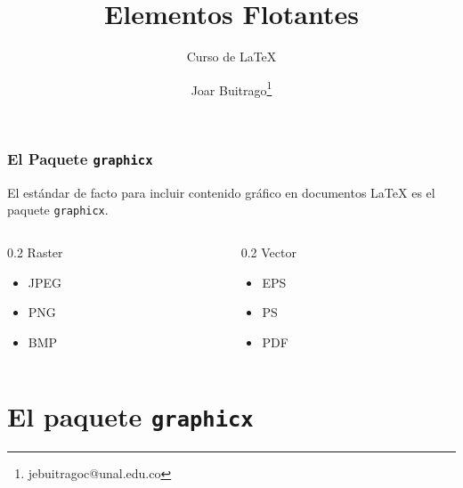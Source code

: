 \documentclass[12pt,aspectratio=169,ignorenonframetext]{ltxbeamer}
\title{Elementos Flotantes}
\subtitle{Curso de {\lmr\LaTeX}}
\author{Joar Buitrago\texorpdfstring{\thanks{jebuitragoc@unal.edu.co}}{ <jebuitragoc@unal.edu.co>}}
\date{}
\begin{document}
\begin{frame}
\maketitle
\end{frame}





\begin{frame}
\frametitle{El Paquete \texttt{graphicx}}

El estándar de facto para incluir contenido gráfico en documentos {\lmr\LaTeX} es el paquete \texttt{graphicx}.

\bigskip\pause

\begin{columns}
    \begin{column}{0.2\textwidth}
        {\Large Raster}

        \begin{itemize}
            \item JPEG
            \item PNG
            \item BMP
        \end{itemize}
    \end{column}
    \begin{column}{0.2\textwidth}
        {\Large Vector}

        \begin{itemize}
            \item EPS
            \item PS
            \item PDF
        \end{itemize}
    \end{column}
\end{columns}
\end{frame}





\section{El paquete \texttt{graphicx}}

\end{document}
